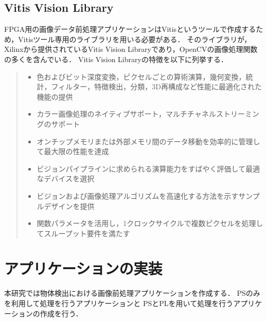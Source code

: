\documentclass[11pt,a4j]{jreport}
\begin{document}
\section{Vitis Vision Library}
FPGA用の画像データ前処理アプリケーションはVitisというツールで作成するため，Vitisツール専用のライブラリを用いる必要がある．
そのライブラリが，Xilinxから提供されているVitis Vision Libraryであり，OpenCVの画像処理関数の多くを含んでいる．
Vitis Vision Libraryの特徴を以下に列挙する．
\begin{quote}
  \begin{itemize}
    \item 色およびビット深度変換，ピクセルごとの算術演算，幾何変換，統計，フィルター，特徴検出，分類，3D再構成など性能に最適化された機能の提供
    \item カラー画像処理のネイティブサポート，マルチチャネルストリーミングのサポート
    \item オンチップメモリまたは外部メモリ間のデータ移動を効率的に管理して最大限の性能を達成
    \item ビジョンパイプラインに求められる演算能力をすばやく評価して最適なデバイスを選択
    \item ビジョンおよび画像処理アルゴリズムを高速化する方法を示すサンプルデザインを提供
    \item 関数パラメータを活用し，1クロックサイクルで複数ピクセルを処理してスループット要件を満たす
  \end{itemize}
\end{quote}
%
\chapter{アプリケーションの実装}
本研究では物体検出における画像前処理アプリケーションを作成する．
PSのみを利用して処理を行うアプリケーションと
PSとPLを用いて処理を行うアプリケーションの作成を行う．
\end{document}
